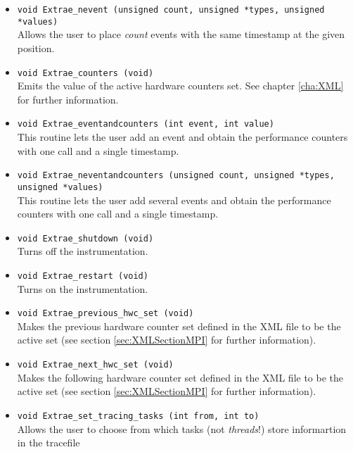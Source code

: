 \begin{itemize}
 \item {\tt void Extrae\_nevent (unsigned count, unsigned *types, unsigned *values)}\\
  Allows the user to place {\em count} events with the same timestamp at the given position.

 \item {\tt void Extrae\_counters (void)}\\
  Emits the value of the active hardware counters set. See chapter \ref{cha:XML} for further information.

 \item {\tt void Extrae\_eventandcounters (int event, int value)}\\
  This routine lets the user add an event and obtain the performance counters with one call and a single timestamp.

 \item {\tt void Extrae\_neventandcounters (unsigned count, unsigned *types, unsigned *values)}\\
  This routine lets the user add several events and obtain the performance counters with one call and a single timestamp.

 \item {\tt void Extrae\_shutdown (void)}\\
  Turns off the instrumentation.

 \item {\tt void Extrae\_restart (void)}\\
  Turns on the instrumentation.

 \item {\tt void Extrae\_previous\_hwc\_set (void)}\\
  Makes the previous hardware counter set defined in the XML file to be the active set (see section \ref{sec:XMLSectionMPI} for further information).

 \item {\tt void Extrae\_next\_hwc\_set (void)}\\
  Makes the following hardware counter set defined in the XML file to be the active set (see section \ref{sec:XMLSectionMPI} for further information).

 \item {\tt void Extrae\_set\_tracing\_tasks (int from, int to)}\\
  Allows the user to choose from which tasks (not {\em threads}!) store informartion in the tracefile


\end{itemize}
